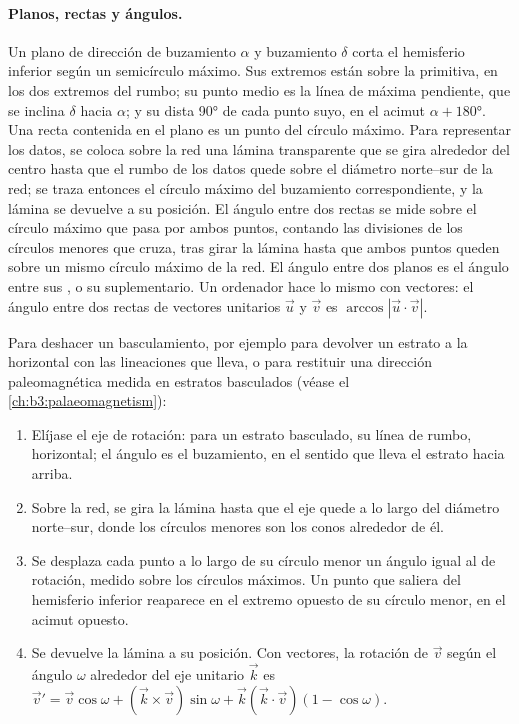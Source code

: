 \paragraph{Planos, rectas y ángulos.}
Un plano de dirección de buzamiento $\alpha$ y buzamiento $\delta$ corta el hemisferio inferior
según un semicírculo máximo. Sus extremos están sobre la primitiva, en los dos extremos
del rumbo; su punto medio es la línea de máxima pendiente, que se inclina $\delta$
hacia $\alpha$; y su  dista \ang{90} de cada punto suyo, en el
acimut $\alpha + \ang{180}$. Una recta contenida en el plano es un punto del
círculo máximo. Para representar los datos, se coloca sobre la red una lámina transparente que se gira
alrededor del centro hasta que el rumbo de los datos quede sobre el diámetro norte--sur de la red;
se traza entonces el círculo máximo del buzamiento correspondiente, y la lámina se
devuelve a su posición. El ángulo entre dos rectas se mide sobre el círculo máximo que pasa
por ambos puntos, contando las divisiones de los círculos menores que cruza, tras
girar la lámina hasta que ambos puntos queden sobre un mismo círculo máximo de la red. El
ángulo entre dos planos es el ángulo entre sus , o su suplementario.
Un ordenador hace lo mismo con vectores: el ángulo entre dos rectas de vectores unitarios
$\vec u$ y $\vec v$ es $\arccos|\vec u\cdot\vec v|$.

\begin{method}\label{met:b3:structural-analysis:rotation}
Para deshacer un basculamiento, por ejemplo para devolver un estrato a la horizontal con las
lineaciones que lleva, o para restituir una dirección paleomagnética medida
en estratos basculados (véase el \cref{ch:b3:palaeomagnetism}):
\begin{enumerate}
  \item Elíjase el eje de rotación: para un estrato basculado, su línea de rumbo,
        horizontal; el ángulo es el buzamiento, en el sentido que lleva el estrato hacia arriba.
  \item Sobre la red, se gira la lámina hasta que el eje quede a lo largo del
        diámetro norte--sur, donde los círculos menores son los conos alrededor
        de él.
  \item Se desplaza cada punto a lo largo de su círculo menor un ángulo igual al de rotación,
        medido sobre los círculos máximos. Un punto que saliera del hemisferio
        inferior reaparece en el extremo opuesto de su círculo menor, en el
        acimut opuesto.
  \item Se devuelve la lámina a su posición. Con vectores, la rotación de $\vec v$ según el
        ángulo $\omega$ alrededor del eje unitario $\vec k$ es $\vec v' = \vec v
        \cos\omega + (\vec k\times\vec v)\sin\omega + \vec k(\vec k\cdot\vec
        v)(1 - \cos\omega)$.
\end{enumerate}
\end{method}


